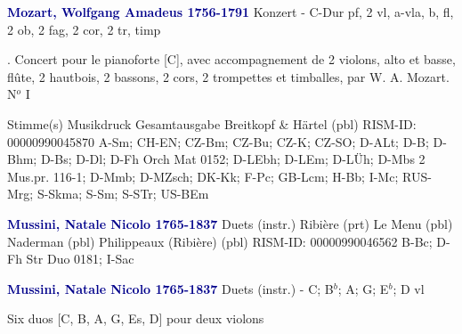 \documentclass[twocolumn]{book}
\begin{document}
\newline \par \vspace{7pt} \textcolor{darkblue}{\textbf{Mozart, Wolfgang Amadeus  1756-1791}}
\newline Konzert - C-Dur
\newline pf, 2 vl, a-vla, b, fl, 2 ob, 2 fag, 2 cor, 2 tr, timp
\newline \begin{itshape}. Concert pour le pianoforte [C], avec accompagnement de 2 violons, alto et basse, flûte, 2 hautbois, 2 bassons, 2 cors, 2 trompettes et timballes, par W. A. Mozart. N$^o$ I\end{itshape} 
\newline \textcolor{darkblue}{}  Stimme(s)
\newline Musikdruck
\newline Gesamtausgabe
\newline Breitkopf \& Härtel  (pbl)
\newline RISM-ID: 00000990045870
\newline A-Sm; CH-EN; CZ-Bm; CZ-Bu; CZ-K; CZ-SO; D-ALt; D-B; D-Bhm; D-Bs; D-Dl; D-Fh  Orch Mat 0152; D-LEbh; D-LEm; D-LÜh; D-Mbs  2 Mus.pr. 116-1; D-Mmb; D-MZsch; DK-Kk; F-Pc; GB-Lcm; H-Bb; I-Mc; RUS-Mrg; S-Skma; S-Sm; S-STr; US-BEm
\newline \par \vspace{7pt} \textcolor{darkblue}{\textbf{Mussini, Natale Nicolo  1765-1837}}
\newline Duets (instr.)
\newline Ribière  (prt)
\newline Le Menu  (pbl)
\newline Naderman  (pbl)
\newline Philippeaux (Ribière)  (pbl)
\newline RISM-ID: 00000990046562
\newline B-Bc; D-Fh  Str Duo 0181; I-Sac
\newline \par \vspace{7pt} \textcolor{darkblue}{\textbf{Mussini, Natale Nicolo  1765-1837}}
\newline Duets (instr.) - C; B$^b$; A; G; E$^b$; D
 vl
\newline \begin{itshape}Six duos [C, B, A, G, Es, D] pour deux violons\end{itshape} 
\end{document}
